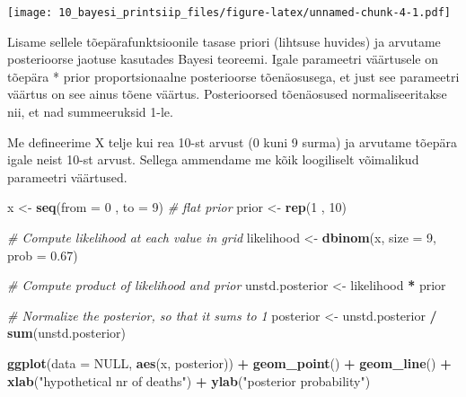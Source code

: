 \documentclass[]{book}
\newenvironment{Shaded}{\begin{snugshade}}{\end{snugshade}}
\newcommand{\KeywordTok}[1]{\textcolor[rgb]{0.13,0.29,0.53}{\textbf{#1}}}
\newcommand{\DataTypeTok}[1]{\textcolor[rgb]{0.13,0.29,0.53}{#1}}
\newcommand{\DecValTok}[1]{\textcolor[rgb]{0.00,0.00,0.81}{#1}}
\newcommand{\FloatTok}[1]{\textcolor[rgb]{0.00,0.00,0.81}{#1}}
\newcommand{\StringTok}[1]{\textcolor[rgb]{0.31,0.60,0.02}{#1}}
\newcommand{\CommentTok}[1]{\textcolor[rgb]{0.56,0.35,0.01}{\textit{#1}}}
\newcommand{\OtherTok}[1]{\textcolor[rgb]{0.56,0.35,0.01}{#1}}
\newcommand{\OperatorTok}[1]{\textcolor[rgb]{0.81,0.36,0.00}{\textbf{#1}}}
\newcommand{\NormalTok}[1]{#1}
\begin{document}
\texttt{[image: 10\_bayesi\_printsiip\_files/figure-latex/unnamed-chunk-4-1.pdf]}

Lisame sellele tõepärafunktsioonile tasase priori (lihtsuse huvides) ja
arvutame posterioorse jaotuse kasutades Bayesi teoreemi. Igale
parameetri väärtusele on tõepära * prior proportsionaalne posterioorse
tõenäosusega, et just see parameetri väärtus on see ainus tõene väärtus.
Posterioorsed tõenäosused normaliseeritakse nii, et nad summeeruksid
1-le.

Me defineerime X telje kui rea 10-st arvust (0 kuni 9 surma) ja arvutame
tõepära igale neist 10-st arvust. Sellega ammendame me kõik loogiliselt
võimalikud parameetri väärtused.



\begin{Shaded}
\begin{Highlighting}[]
\NormalTok{x <-}\StringTok{ }\KeywordTok{seq}\NormalTok{(}\DataTypeTok{from =} \DecValTok{0}\NormalTok{ , }\DataTypeTok{to =} \DecValTok{9}\NormalTok{)}
\CommentTok{# flat prior}
\NormalTok{prior <-}\StringTok{ }\KeywordTok{rep}\NormalTok{(}\DecValTok{1}\NormalTok{ , }\DecValTok{10}\NormalTok{)}

\CommentTok{# Compute likelihood at each value in grid}
\NormalTok{likelihood <-}\StringTok{ }\KeywordTok{dbinom}\NormalTok{(x, }\DataTypeTok{size =} \DecValTok{9}\NormalTok{, }\DataTypeTok{prob =} \FloatTok{0.67}\NormalTok{)}

\CommentTok{# Compute product of likelihood and prior}
\NormalTok{unstd.posterior <-}\StringTok{ }\NormalTok{likelihood }\OperatorTok{*}\StringTok{ }\NormalTok{prior}

\CommentTok{# Normalize the posterior, so that it sums to 1}
\NormalTok{posterior <-}\StringTok{ }\NormalTok{unstd.posterior }\OperatorTok{/}\StringTok{ }\KeywordTok{sum}\NormalTok{(unstd.posterior)}

\KeywordTok{ggplot}\NormalTok{(}\DataTypeTok{data =} \OtherTok{NULL}\NormalTok{, }\KeywordTok{aes}\NormalTok{(x, posterior)) }\OperatorTok{+}\StringTok{ }
\StringTok{  }\KeywordTok{geom_point}\NormalTok{() }\OperatorTok{+}
\StringTok{  }\KeywordTok{geom_line}\NormalTok{() }\OperatorTok{+}
\StringTok{  }\KeywordTok{xlab}\NormalTok{(}\StringTok{"hypothetical nr of deaths"}\NormalTok{) }\OperatorTok{+}\StringTok{ }
\StringTok{  }\KeywordTok{ylab}\NormalTok{(}\StringTok{"posterior probability"}\NormalTok{)}
\end{Highlighting}
\end{Shaded}
\end{document}
